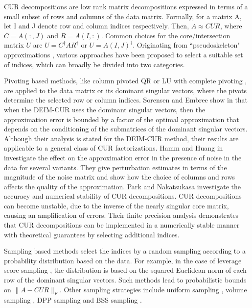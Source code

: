 \documentclass[12pt, a4paper]{article}
\def\norm#1{\|#1\|}
\theoremstyle{remark}
\begin{document}
\hspace{5mm}CUR decompositions are low rank matrix decompositions expressed in terms of a small subset of rows and columns of the data matrix. Formally, for a matrix A, let I and J denote row and column indices respectively. Then, $A \approx CUR$, where $C = A(:,J)$ and $R = A(I,:)$. Common choices for the core/intersection matrix $U$ are $U = C^\dagger A R^\dagger$ or $U = A(I,J)^\dagger$. Originating from ``pseudoskeleton" approximations \cite{goreinov1997theory}, various approaches have been proposed to select a suitable set of indices, which can broadly be divided into two categories.\par
Pivoting based methods, like column pivoted QR \cite{golub2013matrix} or LU with complete pivoting \cite{trefethen1997numerical}, are applied to the data matrix or its dominant singular vectors, where the pivots determine the selected row or column indices. Sorensen and Embree show in \cite{sorensen2016deim} that when the DEIM-CUR uses the dominant singular vectors, then the approximation error is bounded by a factor of the optimal approximation that depends on the conditioning of the submatrices of the dominant singular vectors. Although their analysis is stated for the DEIM-CUR method, their results are applicable to a general class of CUR factorizations. Hamm and Huang in \cite{hamm2021perturbations} investigate the effect on the approximation error in the presence of noise in the data for several variants. They give perturbation estimates in terms of the magnitude of the noise matrix and show how the choice of columns and rows affects the quality of the approximation. Park and Nakatsukasa \cite{park2025accuracy} investigate the accuracy and numerical stability of CUR decompositions. CUR decompositions can become unstable, due to the inverse of the nearly singular core matrix, causing an amplification of errors. Their finite precision analysis demonstrates that CUR decompositions can be implemented in a numerically stable manner with theoretical guarantees by selecting additional indices. \par
Sampling based methods select the indices by a random sampling according to a probability distribution based on the data. For example, in the case of leverage score sampling \cite{mahoney2009cur}, the distribution is based on the squared Euclidean norm  of each row of the dominant singular vectors. Such methods lead to probabilistic bounds on $\norm{A-CUR}_F$. Other sampling strategies include uniform sampling \cite{chiu2013sublinear}, volume sampling \cite{cortinovis2020low}\cite{deshpande2006adaptive}, DPP sampling \cite{derezinski2021determinantal} and BSS sampling \cite{boutsidis2014near}. 	\par
\end{document}
